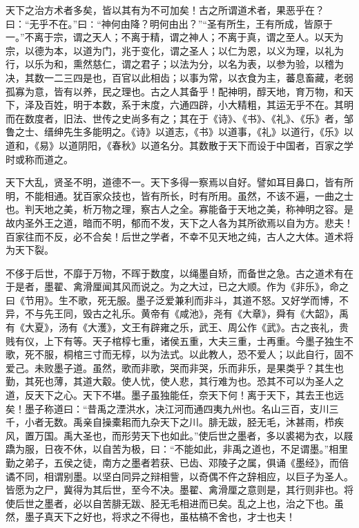 \documentclass[]{article}
\begin{document}
天下之治方术者多矣，皆以其有为不可加矣！古之所谓道术者，果恶乎在？曰：``无乎不在。''曰∶``神何由降？明何由出？''``圣有所生，王有所成，皆原于一。''不离于宗，谓之天人；不离于精，谓之神人；不离于真，谓之至人。以天为宗，以德为本，以道为门，兆于变化，谓之圣人；以仁为恩，以义为理，以礼为行，以乐为和，熏然慈仁，谓之君子；以法为分，以名为表，以参为验，以稽为决，其数一二三四是也，百官以此相齿；以事为常，以衣食为主，蕃息畜藏，老弱孤寡为意，皆有以养，民之理也。古之人其备乎！配神明，醇天地，育万物，和天下，泽及百姓，明于本数，系于末度，六通四辟，小大精粗，其运无乎不在。其明而在数度者，旧法、世传之史尚多有之；其在于《诗》、《书》、《礼》、《乐》者，邹鲁之士、缙绅先生多能明之。《诗》以道志，《书》以道事，《礼》以道行，《乐》以道和，《易》以道阴阳，《春秋》以道名分。其数散于天下而设于中国者，百家之学时或称而道之。

天下大乱，贤圣不明，道德不一。天下多得一察焉以自好。譬如耳目鼻口，皆有所明，不能相通。犹百家众技也，皆有所长，时有所用。虽然，不该不遍，一曲之士也。判天地之美，析万物之理，察古人之全。寡能备于天地之美，称神明之容。是故内圣外王之道，暗而不明，郁而不发，天下之人各为其所欲焉以自为方。悲夫！百家往而不反，必不合矣！后世之学者，不幸不见天地之纯，古人之大体。道术将为天下裂。

不侈于后世，不靡于万物，不晖于数度，以绳墨自矫，而备世之急。古之道术有在于是者，墨翟、禽滑厘闻其风而说之。为之大过，已之大顺。作为《非乐》，命之曰《节用》。生不歌，死无服。墨子泛爱兼利而非斗，其道不怒。又好学而博，不异，不与先王同，毁古之礼乐。黄帝有《咸池》，尧有《大章》，舜有《大韶》，禹有《大夏》，汤有《大濩》，文王有辟雍之乐，武王、周公作《武》。古之丧礼，贵贱有仪，上下有等。天子棺椁七重，诸侯五重，大夫三重，士再重。今墨子独生不歌，死不服，桐棺三寸而无椁，以为法式。以此教人，恐不爱人；以此自行，固不爱己。未败墨子道。虽然，歌而非歌，哭而非哭，乐而非乐，是果类乎？其生也勤，其死也薄，其道大觳。使人忧，使人悲，其行难为也。恐其不可以为圣人之道，反天下之心。天下不堪。墨子虽独能任，奈天下何！离于天下，其去王也远矣！墨子称道曰：``昔禹之湮洪水，决江河而通四夷九州也。名山三百，支川三千，小者无数。禹亲自操橐耜而九杂天下之川。腓无跋，胫无毛，沐甚雨，栉疾风，置万国。禹大圣也，而形劳天下也如此。''使后世之墨者，多以裘褐为衣，以屐蹻为服，日夜不休，以自苦为极，曰：``不能如此，非禹之道也，不足谓墨。''相里勤之弟子，五侯之徒，南方之墨者若获、已齿、邓陵子之属，俱诵《墨经》，而倍谲不同，相谓别墨。以坚白同异之辩相訾，以奇偶不仵之辞相应，以巨子为圣人。皆愿为之尸，冀得为其后世，至今不决。墨翟、禽滑厘之意则是，其行则非也。将使后世之墨者，必以自苦腓无跋、胫无毛相进而已矣。乱之上也，治之下也。虽然，墨子真天下之好也，将求之不得也，虽枯槁不舍也，才士也夫！
\end{document}
